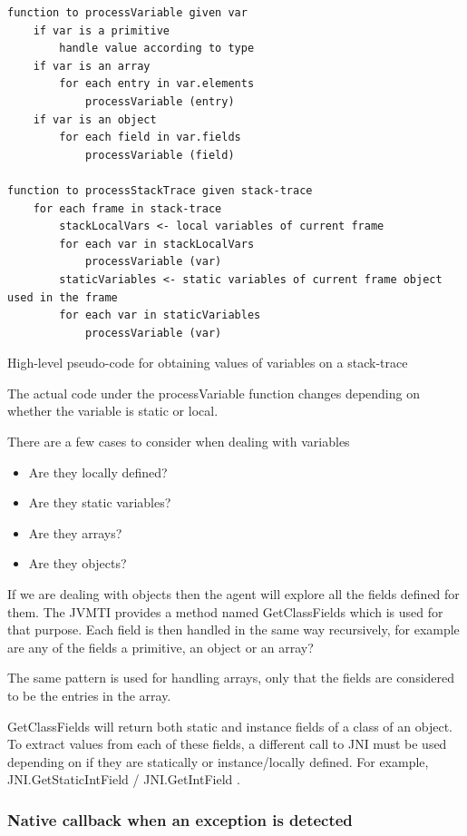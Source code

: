 \begin{listing}[H]
\begin{verbatim}
function to processVariable given var
    if var is a primitive
        handle value according to type 
    if var is an array
        for each entry in var.elements
            processVariable (entry)
    if var is an object
        for each field in var.fields
            processVariable (field)

function to processStackTrace given stack-trace           
    for each frame in stack-trace
        stackLocalVars <- local variables of current frame
        for each var in stackLocalVars
            processVariable (var)
        staticVariables <- static variables of current frame object used in the frame
        for each var in staticVariables
            processVariable (var)
\end{verbatim}
\caption{High-level pseudo-code for obtaining values of variables on a stack-trace}
\end{listing}

The actual code under the processVariable function changes depending on whether the variable is static or local.

There are a few cases to consider when dealing with variables
\begin{itemize}
  \item Are they locally defined?
  \item Are they static variables? 
  \item Are they arrays?
  \item Are they objects?
\end{itemize}

If we are dealing with objects then the agent will explore all the fields defined for them. The JVMTI provides a method named GetClassFields which is used for that purpose. Each field is then handled in the same way recursively, for example are any of the fields a primitive, an object or an array?

The same pattern is used for handling arrays, only that the fields are considered to be the entries in the array.

GetClassFields will return both static and instance fields of a class of an object. To extract values from each of these fields, a different call to JNI must be used depending on if they are statically or instance/locally defined. For example, JNI.GetStaticIntField / JNI.GetIntField  \cite{jnibook}. 

\subsubsection{Native callback when an exception is detected}

